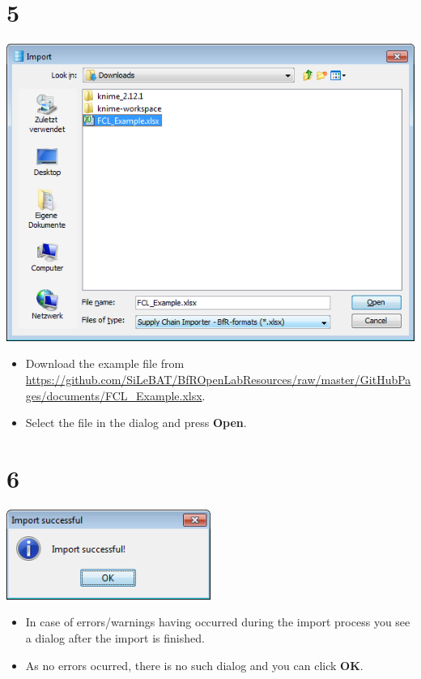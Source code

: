 \documentclass[10pt]{beamer}
\begin{document}
\section{5}
\begin{frame}
	\begin{center}
  		\includegraphics[height=0.6\textheight]{5.png}
	\end{center}
	\begin{itemize}
		\item Download the example file from \url{https://github.com/SiLeBAT/BfROpenLabResources/raw/master/GitHubPages/documents/FCL_Example.xlsx}.
		\item Select the file in the dialog and press \textbf{Open}.
	\end{itemize}
\end{frame}

\section{6}
\begin{frame}
	\begin{center}
  		\includegraphics[width=0.5\textwidth]{6.png}
	\end{center}
	\begin{itemize}
		\item In case of errors/warnings having occurred during the import process you see a dialog after the import is finished.
		\item As no errors ocurred, there is no such dialog and you can click \textbf{OK}.
	\end{itemize}
\end{frame}
\end{document}
